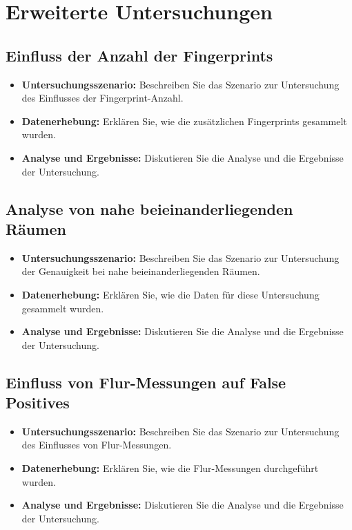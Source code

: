 \chapter{Erweiterte Untersuchungen}

\section{Einfluss der Anzahl der Fingerprints}
\begin{itemize}
    \item \textbf{Untersuchungsszenario:} Beschreiben Sie das Szenario zur Untersuchung des Einflusses der Fingerprint-Anzahl.
    \item \textbf{Datenerhebung:} Erklären Sie, wie die zusätzlichen Fingerprints gesammelt wurden.
    \item \textbf{Analyse und Ergebnisse:} Diskutieren Sie die Analyse und die Ergebnisse der Untersuchung.
\end{itemize}

\section{Analyse von nahe beieinanderliegenden Räumen}
\begin{itemize}
    \item \textbf{Untersuchungsszenario:} Beschreiben Sie das Szenario zur Untersuchung der Genauigkeit bei nahe beieinanderliegenden Räumen.
    \item \textbf{Datenerhebung:} Erklären Sie, wie die Daten für diese Untersuchung gesammelt wurden.
    \item \textbf{Analyse und Ergebnisse:} Diskutieren Sie die Analyse und die Ergebnisse der Untersuchung.
\end{itemize}

\section{Einfluss von Flur-Messungen auf False Positives}
\begin{itemize}
    \item \textbf{Untersuchungsszenario:} Beschreiben Sie das Szenario zur Untersuchung des Einflusses von Flur-Messungen.
    \item \textbf{Datenerhebung:} Erklären Sie, wie die Flur-Messungen durchgeführt wurden.
    \item \textbf{Analyse und Ergebnisse:} Diskutieren Sie die Analyse und die Ergebnisse der Untersuchung.
\end{itemize}

